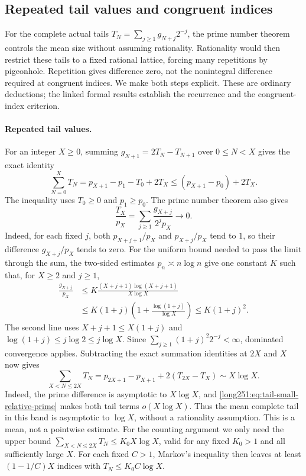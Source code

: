 \subsection{Repeated tail values and congruent indices}
\label{long251:sec:xr-compression}

For the complete actual tails $T_N=\sum_{j\ge1}g_{N+j}2^{-j}$, the prime
number theorem controls the mean size without assuming rationality.
Rationality would then restrict these tails to a fixed rational lattice,
forcing many repetitions by pigeonhole.  Repetition gives difference zero,
not the nonintegral difference required at congruent indices.  We make
both steps explicit.  These are ordinary deductions; the linked formal
results establish the recurrence and the congruent-index criterion.

\paragraph{Repeated tail values.}
For an integer $X\ge0$, summing $g_{N+1}=2T_N-T_{N+1}$ over
$0\le N<X$ gives the exact identity
\[
 \sum_{N=0}^{X}T_N=p_{X+1}-p_1-T_0+2T_X
 \le(p_{X+1}-p_0)+2T_X.
\]
The inequality uses $T_0\ge0$ and $p_1\ge p_0$.  The prime number theorem
\cite[Ch.~6]{mv2007} also gives
\begin{equation}\label{long251:eq:tail-small-relative-prime}
 \frac{T_X}{p_X}
 =\sum_{j\ge1}\frac{g_{X+j}}{2^jp_X}\longrightarrow0.
\end{equation}
Indeed, for each fixed $j$, both $p_{X+j+1}/p_X$ and $p_{X+j}/p_X$
tend to $1$, so their difference $g_{X+j}/p_X$ tends to zero.
For the uniform bound needed to pass the limit through the sum, the
two-sided estimates $p_n\asymp n\log n$ give one constant $K$ such that,
for $X\ge2$ and $j\ge1$,
\[
 \begin{aligned}
 \frac{g_{X+j}}{p_X}
 &\le K\frac{(X+j+1)\log(X+j+1)}{X\log X}\\
 &\le K(1+j)\left(1+\frac{\log(1+j)}{\log X}\right)
 \le K(1+j)^2.
 \end{aligned}
\]
The second line uses $X+j+1\le X(1+j)$ and
$\log(1+j)\le j\log2\le j\log X$.
Since $\sum_{j\ge1}(1+j)^2 2^{-j}<\infty$, dominated convergence applies.
Subtracting the exact summation identities at $2X$ and $X$ now gives
\[
 \sum_{X<N\le2X}T_N
 =p_{2X+1}-p_{X+1}+2(T_{2X}-T_X)
 \sim X\log X.
\]
Indeed, the prime difference is asymptotic to $X\log X$, and
\eqref{long251:eq:tail-small-relative-prime} makes both tail terms
$o(X\log X)$.  Thus the mean complete tail in this band is asymptotic
to $\log X$, without a rationality assumption.  This is a mean, not a
pointwise estimate.  For the counting argument we only need the upper
bound $\sum_{X<N\le2X}T_N\le K_0X\log X$, valid for any fixed $K_0>1$
and all sufficiently large $X$.  For each fixed $C>1$, Markov's inequality
then leaves at least $(1-1/C)X$ indices with $T_N\le K_0C\log X$.

